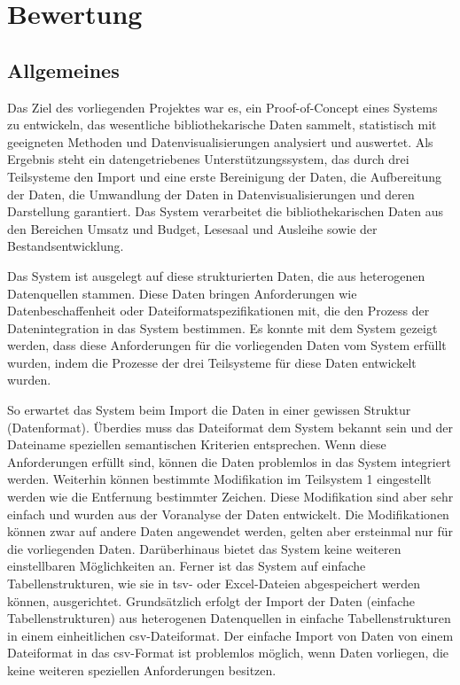 \section{Bewertung}

\subsection{Allgemeines}
\label{chap:five_three_one}
Das Ziel des vorliegenden Projektes war es, ein Proof-of-Concept eines Systems zu entwickeln, 
das wesentliche bibliothekarische Daten sammelt, statistisch mit geeigneten Methoden und
Datenvisualisierungen analysiert und auswertet. Als Ergebnis steht ein datengetriebenes 
Unterstützungssystem, das durch drei Teilsysteme den Import und eine erste Bereinigung der Daten,
die Aufbereitung der Daten, die Umwandlung der Daten in Datenvisualisierungen und deren Darstellung garantiert. 
Das System verarbeitet die bibliothekarischen Daten aus den Bereichen Umsatz und Budget, Lesesaal und Ausleihe 
sowie der Bestandsentwicklung.

Das System ist ausgelegt auf diese strukturierten Daten, die aus heterogenen Datenquellen stammen.
Diese Daten bringen Anforderungen wie Datenbeschaffenheit oder Dateiformatspezifikationen mit, 
die den Prozess der Datenintegration in das System bestimmen. Es konnte mit dem System gezeigt werden, 
dass diese Anforderungen für die vorliegenden Daten vom System erfüllt wurden, indem die Prozesse 
der drei Teilsysteme für diese Daten entwickelt wurden. 

So erwartet das System beim Import die Daten in einer gewissen Struktur (Datenformat). 
Überdies muss das Dateiformat dem System bekannt sein und der Dateiname speziellen semantischen 
Kriterien entsprechen. Wenn diese Anforderungen erfüllt sind, können die Daten problemlos in das System integriert werden.
Weiterhin können bestimmte Modifikation im Teilsystem 1 eingestellt werden wie die Entfernung
bestimmter Zeichen. Diese Modifikation sind aber sehr einfach und wurden aus der Voranalyse
der Daten entwickelt. Die Modifikationen können zwar auf andere Daten angewendet werden, gelten aber ersteinmal nur für die vorliegenden Daten. 
Darüberhinaus bietet das System keine weiteren einstellbaren Möglichkeiten an. Ferner ist das System auf einfache 
Tabellenstrukturen, wie sie in tsv- oder Excel-Dateien abgespeichert werden können, ausgerichtet.
Grundsätzlich erfolgt der Import der Daten (einfache Tabellenstrukturen) aus heterogenen Datenquellen 
in einfache Tabellenstrukturen in einem einheitlichen csv-Dateiformat. Der einfache Import von Daten von einem Dateiformat 
in das csv-Format ist problemlos möglich, wenn Daten vorliegen, die keine weiteren speziellen
Anforderungen besitzen.

